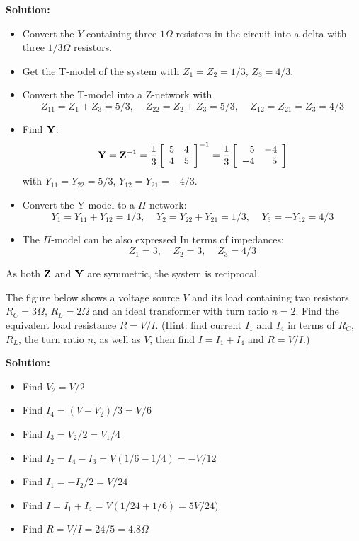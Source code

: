  {\bf Solution:}
 \begin{itemize}
 \item Convert the $Y$ containing three $1\Omega$ resistors in the circuit 
 into a delta with three $1/3\Omega$ resistors.
 \item Get the T-model of the system with $Z_1=Z_2=1/3$, $Z_3=4/3$.
 \item Convert the T-model into a Z-network with
 \[ Z_{11}=Z_1+Z_3=5/3,\;\;\;\;Z_{22}=Z_2+Z_3=5/3,
 	\;\;\;\;Z_{12}=Z_{21}=Z_3=4/3 \]
 \item Find ${\bf Y}$:
 \[ {\bf Y}={\bf Z}^{-1}=\frac{1}{3}\left[ \begin{array}{rr}
 	5 & 4 \\ 4 & 5 \end{array} \right]^{-1}
 	=\frac{1}{3}\left[ \begin{array}{rr} 5 & -4 \\ -4 & 5 \end{array} \right]
 \]
 	with $Y_{11}=Y_{22}=5/3$, $Y_{12}=Y_{21}=-4/3$.
 \item Convert the Y-model to a $\Pi$-network:
 \[ Y_1=Y_{11}+Y_{12}=1/3,\;\;\;\;Y_2=Y_{22}+Y_{21}=1/3,\;\;\;\;Y_3=-Y_{12}=4/3 \]
 \item The $\Pi$-model can be also expressed In terms of impedances:
 \[ Z_1=3,\;\;\;\;Z_2=3,\;\;\;\;Z_3=4/3 \]
 \end{itemize}
 As both ${\bf Z}$ and ${\bf Y}$ are symmetric, the system is reciprocal.

\item The figure below shows a voltage source $V$ and its load containing
two resistors $R_C=3\Omega$, $R_L=2\Omega$ and an ideal transformer with 
turn ratio $n=2$. Find the equivalent load resistance $R=V/I$.
(Hint: find current $I_1$ and $I_4$ in terms of $R_C$, $R_L$, the turn 
ratio $n$, as well as $V$, then find $I=I_1+I_4$ and $R=V/I$.)


 {\bf Solution:}
 
 \begin{itemize}
 \item Find $V_2=V/2$
 \item Find $I_4=(V-V_2)/3=V/6$
 \item Find $I_3=V_2/2=V_1/4$
 \item Find $I_2=I_4-I_3=V(1/6-1/4)=-V/12$
 \item Find $I_1=-I_2/2=V/24$
 \item Find $I=I_1+I_4=V(1/24+1/6)=5V/24)$
 \item Find $R=V/I=24/5=4.8\Omega$
 \end{itemize}

